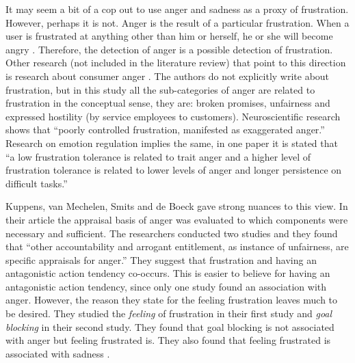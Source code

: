 



It may seem a bit of a cop out to use anger and sadness as a proxy of frustration. However, perhaps it is not. Anger is the result of a particular frustration. When a user is frustrated at anything other than him or herself, he or she will become angry \cite{roest2015}. Therefore, the detection of anger is a possible detection of frustration. Other research (not included in the literature review) that point to this direction is research about consumer anger \cite{funches2011}. The authors do not explicitly write about frustration, but in this study all the sub-categories of anger are related to frustration in the conceptual sense, they are: broken promises, unfairness and expressed hostility (by service employees to customers). Neuroscientific research shows that ``poorly controlled frustration, manifested as exaggerated anger.'' \cite{yamagishi2012} Research on emotion regulation implies the same, in one paper it is stated that ``a low frustration tolerance is related to trait anger and a higher level of frustration tolerance is related to lower levels of anger and longer persistence on difficult tasks.'' \cite{szasz2011} 

Kuppens, van Mechelen, Smits and de Boeck gave strong nuances to this view. In their article the appraisal basis of anger was evaluated to which components were necessary and sufficient. The researchers conducted two studies and they found that ``other accountability and arrogant entitlement, as instance of unfairness, are specific appraisals for anger.'' \cite{kuppens2003} They suggest that frustration and having an antagonistic action tendency co-occurs. This is easier to believe for having an antagonistic action tendency, since only one study found an association with anger. However, the reason they state for the feeling frustration leaves much to be desired. They studied the \textit{feeling} of frustration in their first study and \textit{goal blocking} in their second study. They found that goal blocking is not associated with anger but feeling frustrated is. They also found that feeling frustrated is associated with sadness \cite{kuppens2003}.

